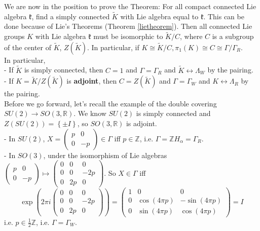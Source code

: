 \documentclass[11pt]{book}
\newcommand{\bb}[1]{\mathbb{#1}}
\newcommand{\mf}[1]{\mathfrak{#1}}
\begin{document}
We are now in the position to prove the Theorem: For all compact connected Lie algebra $\mf{k}$, find a simply connected $\tilde{K}$ with Lie algebra equal to $\mf{k}$. This can be done because of Lie's Theorems (Theorem \ref{lietheorem}). Then all connected Lie groups $K$ with Lie algebra $\mf{k}$ must be isomorphic to $\tilde{K}/C$, where $C$ is a subgroup of the center of $\tilde{K}$, $Z(\tilde{K})$. In particular, if $K \cong \tilde{K}/C, \pi_1(K) \cong C \cong \Gamma/\Gamma_R$.\\
In particular,\\
- If $\tilde{K}$ is simply connected, then $C = 1$ and $\Gamma = \Gamma_R$ and $\tilde{K} \leftrightarrow \Lambda_W$ by the pairing.\\
- If $K = \tilde{K}/Z(\tilde{K})$ is \textbf{adjoint}, then $C = Z(\tilde{K})$ and $\Gamma = \Gamma_W$ and $K \leftrightarrow \Lambda_R$ by the pairing.\\

Before we go forward, let's recall the example of the double covering $SU(2) \to SO(3,\bb{R})$. We know $SU(2)$ is simply connected and $Z(SU(2)) = \left\{\pm I\right\}$, so $SO(3,\bb{R})$ is adjoint.\\

\noindent - In $SU(2)$, $X = \left( \begin{array}{cc}
p & 0  \\
0 & -p  \end{array} \right) \in \Gamma$ iff $p \in \bb{Z}$, i.e. $\Gamma = \bb{Z}{H_{\alpha}} = \Gamma_R$.\\

\noindent - In $SO(3)$, under the isomorphism of Lie algebras $\left( \begin{array}{cc}
p & 0  \\
0 & -p  \end{array} \right) \mapsto \left( \begin{array}{ccc}
0 & 0 & 0 \\
0 & 0 & -2p \\
0 & 2p & 0  \end{array} \right)$. So $X \in \Gamma$ iff
$$\exp(2\pi i \left( \begin{array}{ccc}
0 & 0 & 0 \\
0 & 0 & -2p \\
0 & 2p & 0  \end{array} \right)) = \left( \begin{array}{ccc}
1 & 0 & 0 \\
0 & \cos(4\pi p) & -\sin(4\pi p) \\
0 & \sin(4 \pi p) & \cos(4\pi p)  \end{array} \right) = I$$
i.e. $p \in \frac{1}{2}\bb{Z}$, i.e. $\Gamma = \Gamma_W$.\\
\end{document}
